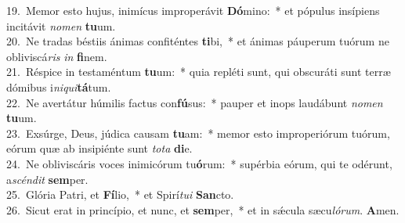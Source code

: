 {19.~}Memor esto hujus, inimícus improperávit \textbf{Dó}mino:~* et pópulus insípiens incitávit \textit{no}\textit{men} \textbf{tu}um.\\
{20.~}Ne tradas béstiis ánimas confiténtes \textbf{ti}bi,~* et ánimas páuperum tuórum ne obliviscá\textit{ris} \textit{in} \textbf{fi}nem.\\
{21.~}Réspice in testaméntum \textbf{tu}um:~* quia repléti sunt, qui obscuráti sunt terræ dómibus i\textit{ni}\textit{qui}\textbf{tá}tum.\\
{22.~}Ne avertátur húmilis factus con\textbf{fú}sus:~* pauper et inops laudábunt \textit{no}\textit{men} \textbf{tu}um.\\
{23.~}Exsúrge, Deus, júdica causam \textbf{tu}am:~* memor esto improperiórum tuórum, eórum quæ ab insipiénte sunt \textit{to}\textit{ta} \textbf{di}e.\\
{24.~}Ne obliviscáris voces inimicórum tu\textbf{ó}rum:~* supérbia eórum, qui te odérunt, a\textit{scén}\textit{dit} \textbf{sem}per.\\
{25.~}Glória Patri, et \textbf{Fí}lio,~* et Spirí\textit{tu}\textit{i} \textbf{San}cto.\\
{26.~}Sicut erat in princípio, et nunc, et \textbf{sem}per,~* et in sǽcula sæcu\textit{ló}\textit{rum}. \textbf{A}men.\\
